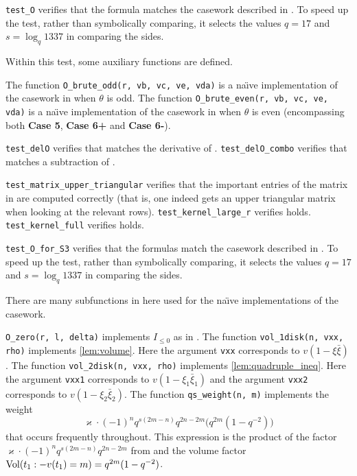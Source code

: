\begin{enumerate}
  \ii \texttt{test\_O} verifies that the formula 
  matches the casework described in .
  To speed up the test, rather than symbolically comparing,
  it selects the values $q = 17$ and $s = \log_q 1337$ in comparing the sides.

  Within this test, some auxiliary functions are defined.
  \begin{itemize}
    \ii The function \texttt{O\_brute\_odd(r, vb, vc, ve, vda)}
    is a na\"{\i}ve implementation of the casework in  when $\theta$ is odd.
    \ii The function \texttt{O\_brute\_even(r, vb, vc, ve, vda)}
    is a na\"{\i}ve implementation of the casework in  when $\theta$ is even
    (encompassing both \textbf{Case 5}, \textbf{Case 6\ts+} and \textbf{Case 6\ts-}).
  \end{itemize}

  \ii \texttt{test\_delO} verifies that 
  matches the derivative of .
  \ii \texttt{test\_delO\_combo} verifies that 
  matches a subtraction of .

  \ii \texttt{test\_matrix\_upper\_triangular} verifies that the important entries
  of the matrix in  are computed correctly
  (that is, one indeed gets an upper triangular matrix
  when looking at the relevant rows).
  \ii \texttt{test\_kernel\_large\_r} verifies  holds.
  \ii \texttt{test\_kernel\_full} verifies  holds.

  \ii \texttt{test\_O\_for\_S3} verifies that the formulas
  match the casework described in .
  To speed up the test, rather than symbolically comparing,
  it selects the values $q = 17$ and $s = \log_q 1337$ in comparing the sides.

  There are many subfunctions in here used for the
  na\"{\i}ve implementations of the casework.
    \begin{itemize}
      \ii \texttt{O\_zero(r, l, delta)} implements $I_{\le 0}$ as in .
      \ii The function \texttt{vol\_1disk(n, vxx, rho)} implements \cref{lem:volume}.
      Here the argument \texttt{vxx} corresponds to $v(1 - \xi \bar \xi)$.
      \ii The function \texttt{vol\_2disk(n, vxx, rho)} implements \cref{lem:quadruple_ineq}.
      Here the argument \texttt{vxx1} corresponds to $v(1 - \xi_1 \bar \xi_1)$
      and the argument \texttt{vxx2} corresponds to $v(1 - \xi_2 \bar \xi_2)$.
      \ii The function \texttt{qs\_weight(n, m)} implements the weight
      \[ \varkappa \cdot (-1)^n q^{s(2m-n)} q^{2n-2m} \Big( q^{2m}(1-q^{-2}) \Big) \]
      that occurs frequently throughout.
      This expression is the product of the factor
      $\varkappa \cdot (-1)^n q^{s(2m-n)} q^{2n-2m}$ from 
      and the volume factor $\operatorname{Vol}(t_1: -v(t_1)=m) = q^{2m} (1-q^{-2})$.


\end{itemize}
\end{enumerate}
